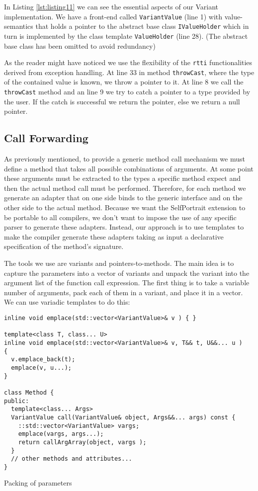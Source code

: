 In Listing \ref{lst:listing11} we can see the essential aspects of our Variant implementation. We have a front-end called \texttt{VariantValue} (line 1)
with value-semantics that holds a pointer to the abstract base class \texttt{IValueHolder} which in turn is implemented by the class template
\texttt{ValueHolder} (line 28). (The abstract base class has been omitted to avoid redundancy)

As the reader might have noticed we use the flexibility of the \texttt{rtti} functionalities derived from exception handling.
At line 33 in method \texttt{throwCast}, where the type of the contained value is known, we throw a pointer to it. At line 8
we call the \texttt{throwCast} method and an line 9 we try to catch a pointer to a type provided by the user. If the catch is
successful we return the pointer, else we return a null pointer.

\subsection{Call Forwarding}

As previously mentioned, to provide a generic method call mechanism we must define a method that takes all possible combinations of arguments.
At some point these arguments must be extracted to the types a specific method expect and then the actual method call must be performed.
Therefore, for each method we generate an adapter that on one side binds to the generic interface and on the other side to the actual method.
Because we want the SelfPortrait extension to be portable to all compilers, we don't want to impose the use of any specific parser to generate
these adapters. Instead, our approach is to use templates to make the compiler generate these adapters taking as input a declarative specification
of the method's signature.

The tools we use are variants and pointers-to-methods. The main idea is to capture the parameters into a vector of variants and unpack the variant
into the argument list of the function call expression. The first thing is to take a variable number of arguments, pack each of them in a variant,
and place it in a vector. We can use variadic templates to do this:

\begin{listing}[H]
\begin{verbatim}
inline void emplace(std::vector<VariantValue>& v ) { }

template<class T, class... U>
inline void emplace(std::vector<VariantValue>& v, T&& t, U&&... u )
{
  v.emplace_back(t);
  emplace(v, u...);
}

class Method {
public:
  template<class... Args>
  VariantValue call(VariantValue& object, Args&&... args) const {
    ::std::vector<VariantValue> vargs;
    emplace(vargs, args...);
    return callArgArray(object, vargs );
  }
  // other methods and attributes...
}
\end{verbatim}
\caption{Packing of parameters}
\label{lst:listing6}
\end{listing}

